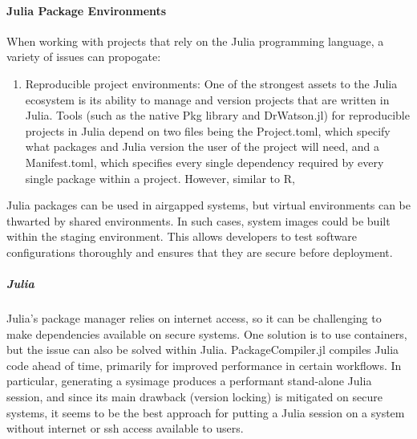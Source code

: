 \documentclass{amia}
\begin{document}
\paragraph{Julia Package Environments}

When working with projects that rely on the Julia programming language, a variety of issues can propogate:

\begin{enumerate}
	\item Reproducible project environments: One of the strongest assets to the Julia ecosystem is its ability to manage and version projects that are written in Julia. Tools (such as the native Pkg library and DrWatson.jl) for reproducible projects in Julia depend on two files being the Project.toml, which specify what packages and Julia version the user of the project will need, and a Manifest.toml, which specifies every single dependency required by every single package within a project. However, similar to R, 
\end{enumerate}

Julia packages can be used in airgapped systems, but virtual environments can be thwarted by shared environments. In such cases, system images could be built within the staging environment. This allows developers to test software configurations thoroughly and ensures that they are secure before deployment. 

\subparagraph*{Julia}

Julia's package manager relies on internet access, so it can be challenging to make dependencies available on secure systems. One solution is to use containers, but the issue can also be solved within Julia. PackageCompiler.jl compiles Julia code ahead of time, primarily for improved performance in certain workflows. In particular, generating a sysimage produces a performant stand-alone Julia session, and since its main drawback (version locking) is mitigated on secure systems, it seems to be the best approach for putting a Julia session on a system without internet or ssh access available to users. 
\end{document}
